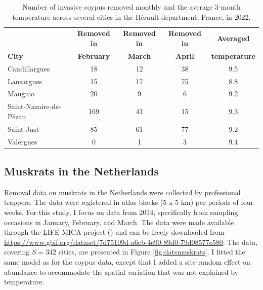 \documentclass[
  11pt,
  a4paper,
]{article}
\begin{document}
\begin{table}[ht]
\centering
\begin{tabular}{lcccc}
\hline
\textbf{} & \textbf{Removed in} & \textbf{Removed in} & \textbf{Removed in} & \textbf{Averaged} \\
\textbf{City} & \textbf{February} & \textbf{March} & \textbf{April} & \textbf{temperature}\\
\hline
Candillargues & 18  & 12    & 38 & 9.5 \\
Lansargues    & 15  & 17    & 75 & 8.8 \\
Mauguio       & 20  & 9 & 6 & 9.2 \\
Saint-Nazaire-de-Pézan & 169    & 41    & 15 & 9.3 \\
Saint-Just    & 85  & 61    & 77 & 9.2 \\
Valergues     & 0 & 1   & 3 & 9.4 \\
\hline
\end{tabular}
\caption{Number of invasive coypus removed monthly and the average 3-month temperature across several cities in the Hérault department, France, in 2022.}
\label{tab:coypus}
\end{table}

\subsection{Muskrats in the Netherlands}\label{muskrats-in-the-netherlands}

Removal data on muskrats in the Netherlands were collected by professional trappers. The data were registered in atlas blocks (5 x 5 km) per periods of four weeks. For this study, I focus on data from 2014, specifically from sampling occasions in January, February, and March. The data were made available through the LIFE MICA project () and can be freely downloaded from \url{https://www.gbif.org/dataset/7d75109d-a6cb-4e90-89d0-79d08577c580}. The data, covering \(S = 342\) cities, are presented in Figure \ref{fig:datsmuskrats}. I fitted the same model as for the coypus data, except that I added a site random effect on abundance to accommodate the spatial variation that was not explained by temperature.
\end{document}
